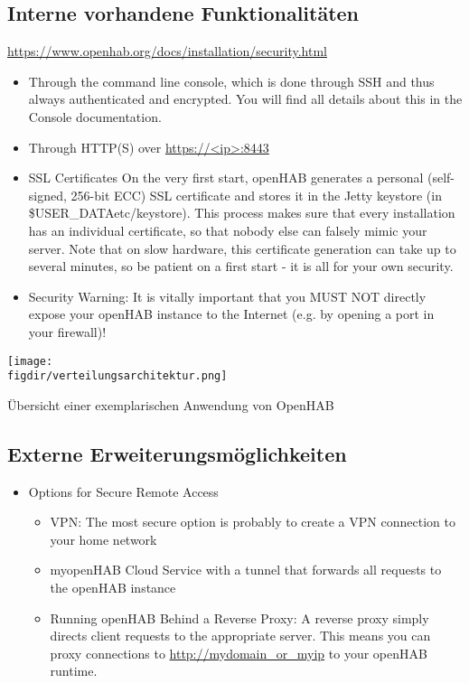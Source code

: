 \subsection{Interne vorhandene Funktionalitäten}
\url{https://www.openhab.org/docs/installation/security.html}
\begin{itemize}
	\item Through the command line console, which is done through SSH and thus always authenticated and encrypted. You will find all details about this in the Console documentation.
	\item Through HTTP(S) over \url{https://<ip>:8443}
	\item SSL Certificates
	On the very first start, openHAB generates a personal (self-signed, 256-bit ECC) SSL certificate and stores it in the Jetty keystore (in \${USER\_DATA}etc/keystore). This process makes sure that every installation has an individual certificate, so that nobody else can falsely mimic your server. Note that on slow hardware, this certificate generation can take up to several minutes, so be patient on a first start - it is all for your own security.
	\item Security Warning: It is vitally important that you MUST NOT directly expose your openHAB instance to the Internet (e.g. by opening a port in your firewall)!
\end{itemize}
\begin{minipage}{\textwidth}
	\centering
	\captionsetup{type=figure}
	\texttt{[image: \\figdir/verteilungsarchitektur.png]}
	\caption{Übersicht einer exemplarischen Anwendung von OpenHAB \label{fig:verteilungs-architektur}}
\end{minipage}
\subsection{Externe Erweiterungsmöglichkeiten}
\begin{itemize}
	\item Options for Secure Remote Access
	\begin{itemize}
		\item VPN: The most secure option is probably to create a VPN connection to your home network
		\item myopenHAB Cloud Service with a tunnel that forwards all requests to the openHAB instance
		\item Running openHAB Behind a Reverse Proxy: A reverse proxy simply directs client requests to the appropriate server. This means you can proxy connections to \url{http://mydomain_or_myip} to your openHAB runtime.
	\end{itemize}
\end{itemize}

